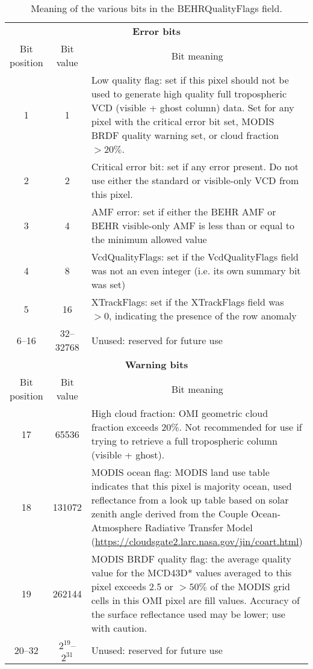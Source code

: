 \documentclass[12pt]{article}
\begin{document}
\begin{table}
\def\arraystretch{1.5}
\begin{tabularx}{\linewidth}{ccX}
\hline
\multicolumn{3}{c}{\textbf{Error bits}} \\
Bit position & Bit value & \multicolumn{1}{c}{Bit meaning} \\ \hline
1 & 1 & Low quality flag: set if this pixel should not be used to generate high quality full tropospheric VCD (visible + ghost column) data. Set for any pixel with the critical error bit set, MODIS BRDF quality warning set, or cloud fraction $> 20\%$.\\
2 & 2 & Critical error bit: set if any error present. Do not use either the standard or visible-only VCD from this pixel. \\
3 & 4 & AMF error: set if either the BEHR AMF or BEHR visible-only AMF is less than or equal to the minimum allowed value \\
4 & 8 & VcdQualityFlags: set if the VcdQualityFlags field was not an even integer (i.e. its own summary bit was set) \\
5 & 16 & XTrackFlags: set if the XTrackFlags field was $> 0$, indicating the presence of the row anomaly \\ 
6--16 & 32--32768 & Unused: reserved for future use \\ \hline
%
\multicolumn{3}{c}{\textbf{Warning bits}} \\
Bit position & Bit value & \multicolumn{1}{c}{Bit meaning} \\ \hline
17 & 65536 & High cloud fraction: OMI geometric cloud fraction exceeds 20\%. Not recommended for use if trying to retrieve a full tropospheric column (visible + ghost). \\
18 & 131072 & MODIS ocean flag: MODIS land use table indicates that this pixel is majority ocean, used reflectance from a look up table based on solar zenith angle derived from the Couple Ocean-Atmosphere Radiative Transfer Model (\url{https://cloudsgate2.larc.nasa.gov/jin/coart.html}) \\ 
19 & 262144 & MODIS BRDF quality flag: the average quality value for the MCD43D* values averaged to this pixel exceeds 2.5 or $>50\%$ of the MODIS grid cells in this OMI pixel are fill values. Accuracy of the surface reflectance used may be lower; use with caution. \\
20--32 & $2^{19}$--$2^{31}$ & Unused: reserved for future use \\ \hline

\end{tabularx}
\caption{Meaning of the various bits in the BEHRQualityFlags field.}
\label{tab:behr-quality-flags}
\end{table}
\end{document}
